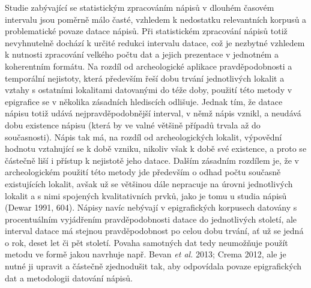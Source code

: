 Studie zabývající se statistickým zpracováním nápisů v dlouhém časovém intervalu jsou poměrně málo časté, vzhledem k nedostatku relevantních korpusů a problematické povaze datace nápisů. Při statistickém zpracování nápisů totiž nevyhnutelně dochází k určité redukci intervalu datace, což je nezbytné vzhledem k nutnosti zpracování velkého počtu dat a jejich prezentace v jednotném a koherentním formátu. Na rozdíl od archeologické aplikace pravděpodobnosti a temporální nejistoty, která především řeší dobu trvání jednotlivých lokalit a vztahy s ostatními lokalitami datovanými do téže doby, použití této metody v epigrafice se v několika zásadních hlediscích odlišuje. Jednak tím, že datace nápisu totiž udává nejpravděpodobnější interval, v němž nápis vznikl, a neudává dobu existence nápisu (která by ve valné většině případů trvala až do současnosti). Nápis tak má, na rozdíl od archeologických lokalit, výpovědní hodnotu vztahující se k době vzniku, nikoliv však k době své existence, a proto se částečně liší i přístup k nejistotě jeho datace. Dalším zásadním rozdílem je, že v archeologickém použití této metody jde především o odhad počtu současně existujících lokalit, avšak už se většinou dále nepracuje na úrovni jednotlivých lokalit a s nimi spojených kvalitativních prvků, jako je tomu u studia nápisů (Dewar 1991, 604). Nápisy navíc nebývají v epigrafických korpusech datovány s procentuálním vyjádřením pravděpodobnosti datace do jednotlivých století, ale interval datace má stejnou pravděpodobnost po celou dobu trvání, ať už se jedná o rok, deset let či pět století. Povaha samotných dat tedy neumožňuje použít metodu ve formě jakou navrhuje např. Bevan {\em et al.} 2013; Crema 2012, ale je nutné ji upravit a částečně zjednodušit tak, aby odpovídala povaze epigrafických dat a metodologii datování nápisů.

